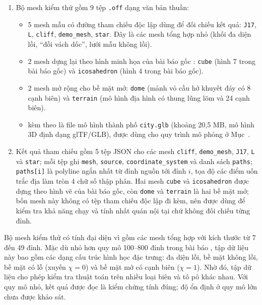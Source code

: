 \begin{enumerate}
\item Bộ mesh kiểm thử gồm 9 tệp \texttt{.off} dạng văn bản thuần:
\begin{itemize}
  \item 5 mesh mẫu có đường tham chiếu độc lập dùng để đối chiếu kết quả: \texttt{J17}, \texttt{L}, \texttt{cliff},
    \texttt{demo\_mesh}, \texttt{star}. Đây là các mesh tổng hợp nhỏ (khối đa diện
    lồi, ``đồi vách dốc'', lưới mẫu không lồi).
  \item 2 mesh dựng lại theo hình minh họa của bài báo gốc \cite{an2024funnel}:
    \texttt{cube} (hình 7 trong bài báo gốc) và \texttt{icosahedron} (hình 4
    trong bài báo gốc).
  \item 2 mesh mở rộng cho bề mặt mở: \texttt{dome} (mảnh vỏ cầu hở khuyết đáy có
    8 cạnh biên) và \texttt{terrain} (mô hình địa hình có thung lũng lõm và 24
    cạnh biên).
  \item kèm theo là file mô hình thành phố \texttt{city.glb} (khoảng 20,5 MB, mô
    hình 3D định dạng glTF/GLB), được dùng cho quy trình mô phỏng ở
    Mục~.
\end{itemize}

\item Kết quả tham chiếu gồm 5 tệp JSON cho các mesh \texttt{cliff},
  \texttt{demo\_mesh}, \texttt{J17}, \texttt{L} và \texttt{star}; mỗi tệp ghi
  \texttt{mesh}, \texttt{source},
  \texttt{coordinate\_system} và danh sách \texttt{paths}; \texttt{paths[i]} là
  polyline ngắn nhất từ đỉnh nguồn tới đỉnh $i$, tọa độ các điểm uốn trắc địa làm
  tròn 4 chữ số thập phân. Hai mesh \texttt{cube} và \texttt{icosahedron} được
  dựng theo hình vẽ của bài báo gốc, còn \texttt{dome} và \texttt{terrain} là hai
  bề mặt mở; bốn mesh này không có tệp tham chiếu độc lập đi kèm, nên được
  dùng để kiểm tra khả năng chạy và tính nhất quán nội tại chứ không đối chiếu
  từng đỉnh.
\end{enumerate}

Bộ mesh kiểm thử có tính đại diện vì gồm các mesh tổng hợp với kích thước từ 7 đến
49 đỉnh. Mặc dù nhỏ hơn quy mô 100--800 đỉnh trong bài báo \cite{an2024funnel},
tập dữ liệu này bao gồm các dạng cấu trúc hình học đặc trưng: đa diện lồi, bề
mặt không lồi, bề mặt có lỗ (xuyến $\chi=0$) và bề mặt mở có cạnh biên ($\chi=1$).
Nhờ đó, tập dữ liệu cho phép kiểm tra thuật toán trên nhiều loại biên và tô pô
khác nhau. Với quy mô nhỏ, kết quả được đọc là kiểm chứng tính đúng; độ ổn định ở
quy mô lớn chưa được khảo sát.

